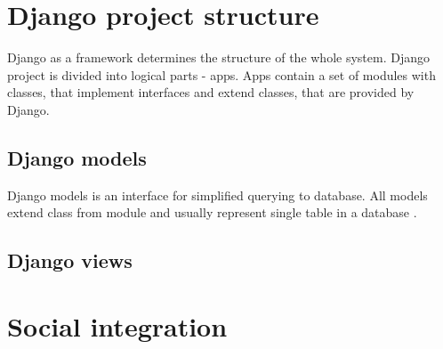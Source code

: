 \section{Django project structure}
Django as a framework determines the structure of the whole system. Django project is divided into logical parts - apps.
Apps contain a set of modules with classes, that implement interfaces and extend classes, that are provided by Django.

\subsection{Django models}
Django models is an interface for simplified querying to database. All models extend class  from
 module and usually represent single table in a database \cite{djangodocs}.


\subsection{Django views}



\section{Social integration}


